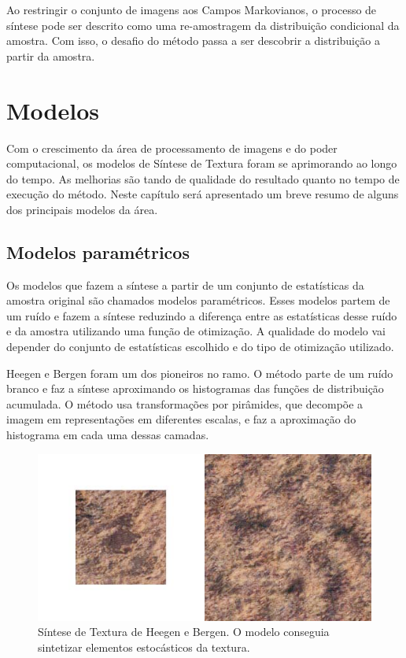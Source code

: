 
Ao restringir o conjunto de imagens aos
Campos Markovianos, o processo de síntese
pode ser descrito como uma re-amostragem
da distribuição condicional da amostra.
Com isso, o desafio do método passa a ser 
descobrir a distribuição a partir
da amostra.


\chapter{Modelos}

Com o crescimento da área de processamento
de imagens e do poder computacional,
os modelos de Síntese de Textura foram
se aprimorando ao longo do tempo.
As melhorias são tando de qualidade
do resultado quanto no tempo de 
execução do método. Neste capítulo
será apresentado um breve resumo de
alguns dos principais modelos
da área.



\section{Modelos paramétricos}

Os modelos que fazem a síntese a partir
de um conjunto de estatísticas da amostra
original são chamados modelos paramétricos.
Esses modelos partem de um ruído e fazem
a síntese reduzindo
a diferença entre as estatísticas desse
ruído e da amostra utilizando uma função de 
otimização.
A qualidade do modelo vai depender do
conjunto de estatísticas escolhido
e do tipo de otimização utilizado.


Heegen e Bergen \cite{Heeger1995} foram
um dos pioneiros no ramo. O método
parte de um ruído branco e faz a síntese
aproximando os histogramas das funções
de distribuição acumulada.
O método usa transformações
por pirâmides, que decompõe a imagem
em representações em diferentes escalas,
e faz a aproximação do histograma
em cada uma dessas camadas.

\begin{figure}[!ht]
	\centering
	\includegraphics[width=\linewidth*2/3]{files/assets/articles/bergen.png}
	\caption{Síntese de Textura de Heegen e Bergen. O modelo
	conseguia sintetizar elementos estocásticos da textura.}
	\label{img:preview}
\end{figure}

